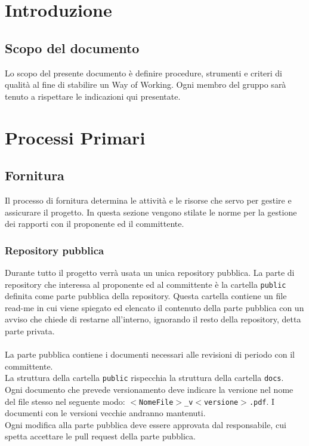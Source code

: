 \documentclass[a4paper, 12pt]{article}
\begin{document}
\makefrontpage

\makeversioni

\tableofcontents
\pagebreak

\section{Introduzione}
\subsection{Scopo del documento}
Lo scopo del presente documento è definire procedure, strumenti e criteri di qualità al fine di stabilire un Way of Working. Ogni membro del gruppo sarà tenuto a rispettare le indicazioni qui presentate.


\section{Processi Primari}
\subsection{Fornitura}\label{fornitura}
Il processo di fornitura determina le attività e le risorse che servo per gestire e assicurare il progetto. In questa sezione vengono stilate le norme per la gestione dei rapporti con il proponente ed il committente.
\subsubsection{Repository pubblica}
Durante tutto il progetto verrà usata un unica repository pubblica. La parte di repository che interessa al proponente ed al committente è la cartella \texttt{public} definita come parte pubblica della repository. Questa cartella contiene un file read-me in cui viene spiegato ed elencato il contenuto della parte pubblica con un avviso che chiede di restarne all'interno, ignorando il resto della repository, detta parte privata.\\\\
La parte pubblica contiene i documenti necessari alle revisioni di periodo con il committente.\\
La struttura della cartella \texttt{public} rispecchia la struttura della cartella \texttt{docs}. \\
Ogni documento che prevede versionamento deve indicare la versione nel nome del file stesso nel seguente modo: \texttt{$<$NomeFile$>$\_v$<$versione$>$.pdf}. I documenti con le versioni vecchie andranno mantenuti. \\
Ogni modifica alla parte pubblica deve essere approvata dal responsabile, cui spetta accettare le pull request della parte pubblica.
\end{document}
